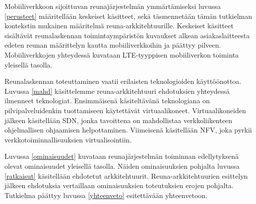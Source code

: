 Mobiiliverkkoon sijoittuvan reunajärjestelmän ymmärtämiseksi luvussa \ref{perusteet} määritellään keskeiset käsitteet, sekä täsmennetään tämän tutkielman kontekstin mukainen määritelmä reuna-arkkitehtuurille.
Keskeiset käsitteet sisältävät reunalaskennan toimintaympäristön kuvaukset alkean asiakaslaitteesta edeten reunan määrittelyn kautta mobiiliverkkoihin ja päättyy pilveen.
Mobiiliverkkojen yhteydessä kuvataan LTE-tyyppisen mobiiliverkon toiminta yleisellä tasolla.

Reunalaskennan toteuttaminen vaatii erilaisten teknologioiden käyttöönottoa. Luvussa \ref{mahd} käsittelemme reuna-arkkitehtuuri ehdotuksien yhteydessä ilmenneet teknologiat. Ensimmäisenä käsiteltävänä teknologiana on pilvipalveluidenkin tuottamiseen käytettävät virtuaalikoneet.
Virtuaalikoneiden jälkeen käsitellään SDN, jonka tavoittena on mahdollistaa verkkoliikenteen ohjelmallisen ohjaamisen helpottaminen. 
Viimeisenä käsitellään NFV, joka pyrkii verkkotoiminnallisuuksien virtualisointiin.

 Luvussa \ref{ominaisuudet} kuvataan reunajärjestelmän toiminnan edellytyksenä olevat ominaisuudet yleisellä tasolla. 
Näiden ominaisuuksien pohjalta luvussa \ref{ratkaisut} käsitellään ehdotetut arkkitehtuurit. 
Reuna-arkkitehtuurien esittelyn jälkeen ehdotuksia vertaillaan ominaisuuksien toteutuksien erojen pohjalta.
Tutkielma päättyy luvussa \ref{yhteenveto} esitettävään yhteenvetoon.

